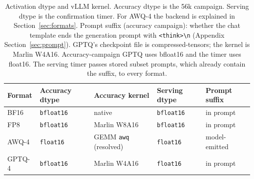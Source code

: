 \documentclass[11pt,a4paper]{article}
\begin{document}
\begin{table}[!htbp]
\centering
\caption{Activation dtype and vLLM kernel. Accuracy dtype is the 56k campaign. Serving dtype is the confirmation timer. For AWQ-4 the backend is explained in Section~\ref{sec:formats}. Prompt suffix (accuracy campaign): whether the chat template ends the generation prompt with \texttt{<think>\textbackslash n} (Appendix Section~\ref{sec:prompt}). GPTQ's checkpoint file is compressed-tensors; the kernel is Marlin W4A16. Accuracy-campaign GPTQ uses bfloat16 and the timer uses float16. The serving timer passes stored subset prompts, which already contain the suffix, to every format.}
\label{tab:dtype}
\small
\begin{tabular}{lllll}
\toprule
\textbf{Format} & \textbf{Accuracy dtype} & \textbf{Accuracy kernel} & \textbf{Serving dtype} & \textbf{Prompt suffix} \\
\midrule
BF16 & \texttt{bfloat16} & native & \texttt{bfloat16} & in prompt \\
FP8 & \texttt{bfloat16} & Marlin W8A16 & \texttt{bfloat16} & in prompt \\
AWQ-4 & \texttt{float16} & GEMM \texttt{awq} (resolved) & \texttt{float16} & model-emitted \\
GPTQ-4 & \texttt{bfloat16} & Marlin W4A16 & \texttt{float16} & in prompt \\
\bottomrule
\end{tabular}
\end{table}
\end{document}
